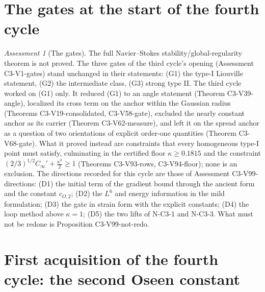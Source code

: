 \documentclass[11pt]{article}
\theoremstyle{plain}
\theoremstyle{definition}
\theoremstyle{remark}
\newtheorem{assessment}[theorem]{Assessment}
\begin{document}
\section{The gates at the start of the fourth cycle}
\label{sec:c4v1-gates}

\begin{assessment}[The gates]
\label{ass:c4v1-gates}
The full Navier--Stokes stability/global-regularity theorem is not
proved.  The three gates of the third cycle's opening
(Assessment C3-V1-gates) stand unchanged in their statements:
(G1) the type-I Liouville statement, (G2) the intermediate class, (G3)
strong type II.  The third cycle worked on (G1) only.  It reduced (G1)
to an angle statement (Theorem C3-V39-angle), localized its cross term
on the anchor within the Gaussian radius (Theorems C3-V19-consolidated,
C3-V58-gate), excluded the nearly constant anchor as its carrier
(Theorem C3-V62-measure), and left it on the spread anchor as a
question of two orientations of explicit order-one quantities
(Theorem C3-V68-gate).  What it proved instead are constraints that
every homogeneous type-I point must satisfy, culminating in the
certified floor \(\kappa\ge0.1815\) and the constraint
\((2/3)^{1/2}C_\infty'+\frac{\kappa^2}2\ge1\) (Theorems C3-V93-rows, C3-V94-floor); none is
an exclusion.  The directions recorded for this cycle are those of
Assessment C3-V99-directions: (D1) the initial term of the gradient
bound through the ancient form and the constant \(c_{O,2}\); (D2) the
\(L^6\) and energy information in the mild formulation; (D3) the gate in
strain form with the explicit constants; (D4) the loop method above
\(\kappa=1\); (D5) the two lifts of N-C3-1 and N-C3-3.  What must not be
redone is Proposition C3-V99-not-redo.
\end{assessment}

\section{First acquisition of the fourth cycle: the second Oseen constant}
\label{sec:c4v1-first}
\end{document}
